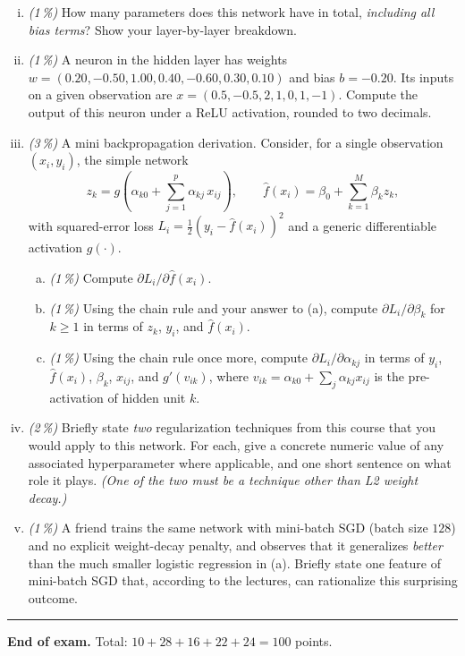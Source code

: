 \documentclass[11pt,a4paper]{article}
\newcommand{\subpoints}[1]{\textit{(#1\,\%)}}
\begin{document}
\begin{enumerate}[(i)]
  \item \subpoints{1} How many parameters does this network have in total, \emph{including all bias terms}? Show your layer-by-layer breakdown.
  \item \subpoints{1} A neuron in the hidden layer has weights $w = (0.20, -0.50, 1.00, 0.40, -0.60, 0.30, 0.10)$ and bias $b = -0.20$. Its inputs on a given observation are $x = (0.5, -0.5, 2, 1, 0, 1, -1)$. Compute the output of this neuron under a ReLU activation, rounded to two decimals.
  \item \subpoints{3} A mini backpropagation derivation. Consider, for a single observation $(x_i, y_i)$, the simple network
  $$z_k = g\!\left(\alpha_{k0} + \sum_{j=1}^p \alpha_{kj}\, x_{ij}\right), \qquad \hat f(x_i) = \beta_0 + \sum_{k=1}^M \beta_k z_k,$$
  with squared-error loss $L_i = \tfrac{1}{2}(y_i - \hat f(x_i))^2$ and a generic differentiable activation $g(\cdot)$.
  \begin{enumerate}[(a)]
    \item \subpoints{1} Compute $\partial L_i / \partial \hat f(x_i)$.
    \item \subpoints{1} Using the chain rule and your answer to (a), compute $\partial L_i / \partial \beta_k$ for $k \ge 1$ in terms of $z_k$, $y_i$, and $\hat f(x_i)$.
    \item \subpoints{1} Using the chain rule once more, compute $\partial L_i / \partial \alpha_{kj}$ in terms of $y_i$, $\hat f(x_i)$, $\beta_k$, $x_{ij}$, and $g'(v_{ik})$, where $v_{ik} = \alpha_{k0} + \sum_j \alpha_{kj} x_{ij}$ is the pre-activation of hidden unit $k$.
  \end{enumerate}
  \item \subpoints{2} Briefly state \emph{two} regularization techniques from this course that you would apply to this network. For each, give a concrete numeric value of any associated hyperparameter where applicable, and one short sentence on what role it plays. \emph{(One of the two must be a technique other than L2 weight decay.)}
  \item \subpoints{1} A friend trains the same network with mini-batch SGD (batch size $128$) and no explicit weight-decay penalty, and observes that it generalizes \emph{better} than the much smaller logistic regression in (a). Briefly state one feature of mini-batch SGD that, according to the lectures, can rationalize this surprising outcome.
\end{enumerate}

\vspace{1em}
\hrule
\vspace{0.5em}

\noindent\textbf{End of exam.} \quad Total: $10 + 28 + 16 + 22 + 24 = 100$ points.
\end{document}
